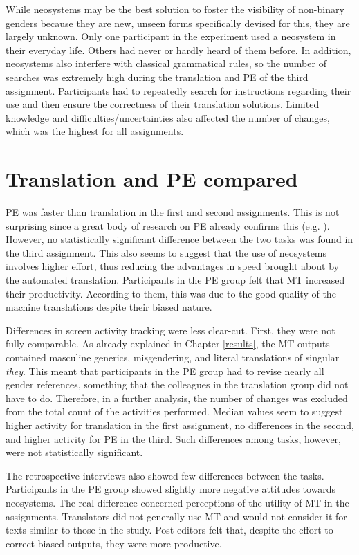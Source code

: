 While neosystems may be the best solution to foster the visibility of non-binary genders because they are new, unseen forms specifically devised for this, they are largely unknown. Only one participant in the experiment used a neosystem in their everyday life. Others had never or hardly heard of them before. In addition, neosystems also interfere with classical grammatical rules, so the number of searches was extremely high during the translation and PE of the third assignment. Participants had to repeatedly search for instructions regarding their use and then ensure the correctness of their translation solutions. Limited knowledge and difficulties/uncertainties also affected the number of changes, which was the highest for all assignments. 



\section{Translation and PE compared}
PE was faster than translation in the first and second assignments. This is not surprising since a great body of research on PE already confirms this (e.g. \cite{jia2019does}). However, no statistically significant difference between the two tasks was found in the third assignment. This also seems to suggest that the use of neosystems involves higher effort, thus reducing the advantages in speed brought about by the automated translation. Participants in the PE group felt that MT increased their productivity. According to them, this was due to the good quality of the machine translations despite their biased nature.

Differences in screen activity tracking were less clear-cut. First, they were not fully comparable. As already explained in Chapter \ref{results}, the MT outputs contained masculine generics, misgendering, and literal translations of singular \textit{they}. This meant that participants in the PE group had to revise nearly all gender references, something that the colleagues in the translation group did not have to do. Therefore, in a further analysis, the number of changes was excluded from the total count of the activities performed. Median values seem to suggest higher activity for translation in the first assignment, no differences in the second, and higher activity for PE in the third. Such differences among tasks, however, were not statistically significant.

The retrospective interviews also showed few differences between the tasks. Participants in the PE group showed slightly more negative attitudes towards neosystems. The real difference concerned perceptions of the utility of MT in the assignments. Translators did not generally use MT and would not consider it for texts similar to those in the study. Post-editors felt that, despite the effort to correct biased outputs, they were more productive.

